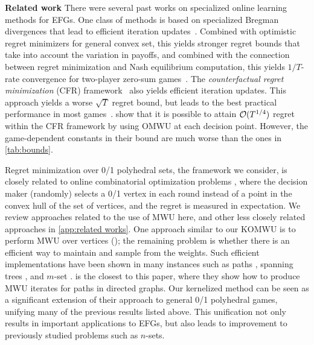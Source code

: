 \noindent\textbf{Related work}\quad
There were several past works on specialized online learning methods for EFGs.
One class of methods is based on specialized Bregman divergences that lead to efficient iteration updates~\citep{Hoda10:Smoothing,Kroer15:Faster,Kroer20:Faster,Farina21:Better}. Combined with optimistic regret minimizers for general convex set, this yields stronger regret bounds that take into account the variation in payoffs, and combined with the connection between regret minimization and Nash equilibrium computation, this yields $1/T$-rate convergence for two-player zero-sum games~\citep{Rakhlin13:Optimization,Syrgkanis15:Fast,Farina19:Optimistic}.
The \emph{counterfactual regret minimization} (CFR) framework~\citet{Zinkevich07:Regret} also yields efficient iteration updates. This approach yields a worse $\sqrt{T}$ regret bound, but leads to the best practical performance in most games~\citep{Kroer18:Solving,Kroer20:Faster,Farina21:Faster}.
\citet{Farina19:Stable} show that it is possible to attain $\mathcal{O}(T^{1/4})$ regret within the CFR framework by using OMWU at each decision point. However, the game-dependent constants in their bound are much worse than the ones in \cref{tab:bounds}.

Regret minimization over 0/1 polyhedral sets, the framework we consider, is closely related to online combinatorial optimization problems \citep{audibert2014regret}, where the decision maker (randomly) selects a 0/1 vertex in each round instead of a point in the convex hull of the set of vertices, and the regret is measured in expectation.
We review approaches related to the use of MWU here, and other less closely related approaches in \cref{app:related works}.
One approach similar to our KOMWU is to perform MWU over vertices (\eg \citet{cesa2012combinatorial}); the remaining problem is whether there is an efficient way to maintain and sample from the weights.
Such efficient implementations have been shown in many instances such as paths \citep{Takimoto03:Path}, spanning trees \citep{koo2007structured}, and $m$-set \citep{warmuth2008randomized}. %
\citep{Takimoto03:Path} is the closest to this paper, where they show how to produce MWU iterates for paths in directed graphs.
Our kernelized method can be seen as a significant extension of their approach to general 0/1 polyhedral games, unifying many of the previous results listed above.
This unification not only results in important applications to EFGs,
but also leads to improvement to previously studied problems such as $n$-sets.



